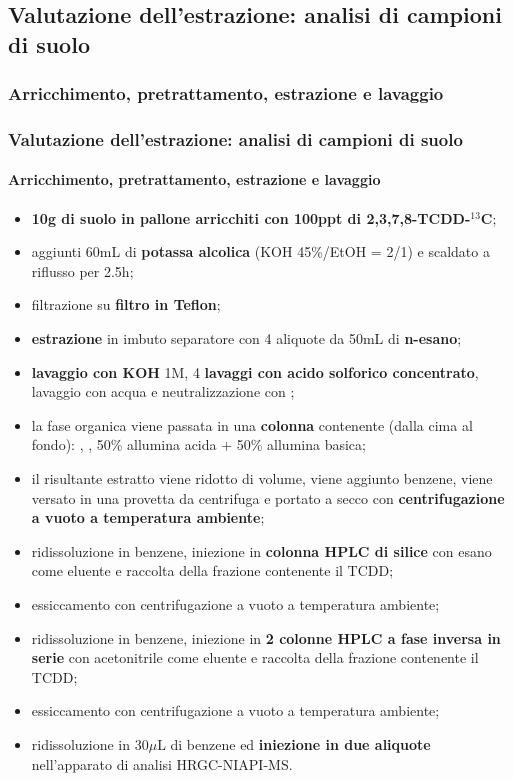 \subsection{Valutazione dell'estrazione: analisi di campioni di suolo}\subsubsection{Arricchimento, pretrattamento, estrazione e lavaggio}\begin{frame}\frametitle{Valutazione dell'estrazione: analisi di campioni di suolo}\framesubtitle{Arricchimento, pretrattamento, estrazione e lavaggio}
{\scriptsize
\begin{itemize}
 \item  {\bf 10g di suolo in pallone arricchiti con 100ppt di 2,3,7,8-TCDD-$^{13}$C};\pause
 \item  aggiunti 60mL di  {\bf potassa alcolica} (KOH 45\%/EtOH = 2/1) e scaldato a riflusso per 2.5h;
 \item filtrazione su  {\bf filtro in Teflon};
 \item  {\bf estrazione} in imbuto separatore con 4 aliquote da 50mL di  {\bf n-esano};
 \item  {\bf lavaggio con KOH} 1M, 4  {\bf lavaggi con acido solforico concentrato}, lavaggio con acqua e neutralizzazione con ;
 \item la fase organica viene passata in una  {\bf colonna} contenente (dalla cima al fondo): , , 50\% allumina acida + 50\% allumina basica;
 \item il risultante estratto viene ridotto di volume, viene aggiunto benzene, viene versato in una provetta da centrifuga e portato a secco con  {\bf centrifugazione a vuoto a temperatura ambiente};
 \item ridissoluzione in benzene, iniezione in  {\bf colonna HPLC di silice} con esano come eluente e raccolta della frazione contenente il TCDD;
 \item essiccamento con centrifugazione a vuoto a temperatura ambiente;
 \item ridissoluzione in benzene, iniezione in  {\bf 2 colonne HPLC a fase inversa in serie} con acetonitrile come eluente e raccolta della frazione contenente il TCDD;
 \item essiccamento con centrifugazione a vuoto a temperatura ambiente;
 \item ridissoluzione in 30$\mu$L di benzene ed  {\bf iniezione in due aliquote} nell'apparato di analisi HRGC-NIAPI-MS. 
\end{itemize}}
\end{frame}
